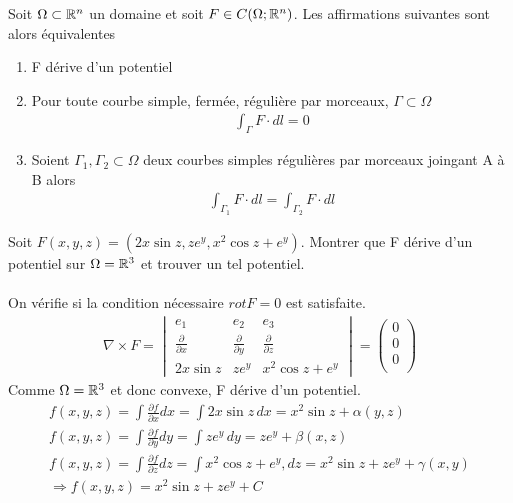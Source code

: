 \begin{myTheorem}
	Soit $\Omega \subset \mathbb{R}^n$ un domaine et soit $F \in C(\Omega;\mathbb{R}^n)$. Les affirmations suivantes sont alors équivalentes
	\begin{enumerate}
		\item F dérive d'un potentiel
		\item Pour toute courbe simple, fermée, régulière par morceaux, $\Gamma \subset \Omega$
			\begin{eqnarray*}
				\int_\Gamma F\cdot dl=0
			\end{eqnarray*}
		\item Soient $\Gamma_1, \Gamma_2 \subset\Omega$ deux courbes simples régulières par morceaux joingant A à B alors
			\begin{eqnarray*}
				\int_{\Gamma_1} F\cdot dl=\int_{\Gamma_2} F\cdot dl
			\end{eqnarray*}
		
	\end{enumerate}
\end{myTheorem}

\begin{myExample}
	Soit $F(x,y,z)=(2x\sin z,ze^y,x^2\cos z+ e^y)$. Montrer que F dérive d'un potentiel sur $\Omega=\mathbb{R}^3$ et trouver un tel potentiel.
	\\\\
	On vérifie si la condition nécessaire $rot F=0$ est satisfaite.
	\begin{eqnarray*}
		\nabla\times F=
		\begin{vmatrix}
		e_1&e_2&e_3
		\\
		\frac{\partial}{\partial x}&\frac{\partial}{\partial y}&\frac{\partial}{\partial z}
		\\
		2x\sin z&ze^y&x^2\cos z+ e^y
		\end{vmatrix}
		=
		\begin{pmatrix}
		0
		\\
		0
		\\  
		0
		\\
		\end{pmatrix}
	\end{eqnarray*}
	Comme $\Omega=\mathbb{R}^3$ et donc convexe, F dérive d'un potentiel.
	\begin{eqnarray*}
		f(x,y,z)=\int \frac{\partial f}{\partial x}dx=\int 2x\sin z\,dx=x^2\sin z +\alpha(y,z)
		\\
		f(x,y,z)=\int \frac{\partial f}{\partial y}dy=\int ze^y\,dy=ze^y +\beta(x,z)
		\\
		f(x,y,z)=\int \frac{\partial f}{\partial z}dz=\int x^2\cos z+e^y,dz=x^2\sin z+ze^y+\gamma(x,y)
		\\
		\Rightarrow f(x,y,z)=x^2\sin z+ze^y+ C
	\end{eqnarray*}
\end{myExample}
